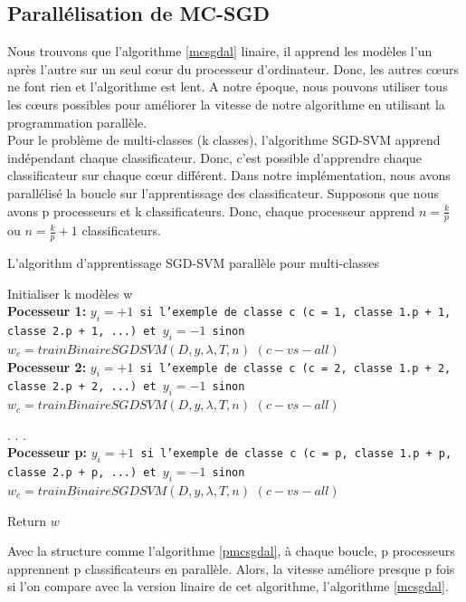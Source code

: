 \pagebreak
\subsection{Parallélisation de MC-SGD}
Nous trouvons que l'algorithme \ref{mcsgdal} linaire, il apprend les modèles l'un après l'autre sur un seul cœur du processeur d'ordinateur. Donc, les autres cœurs ne font rien et l'algorithme est lent. A notre époque, nous pouvons utiliser tous les cœurs possibles pour améliorer la vitesse de notre algorithme en utilisant la programmation parallèle.\\

Pour le problème de multi-classes (k classes), l'algorithme SGD-SVM apprend indépendant chaque classificateur. Donc, c'est possible d'apprendre chaque classificateur sur chaque cœur différent. Dans notre implémentation, nous avons parallélisé la boucle sur l'apprentissage des classificateur. Supposons que nous avons p processeurs et k classificateurs. Donc, chaque processeur apprend $n = \frac{k}{p}$ ou $n = \frac{k}{p} + 1$ classificateurs.

\pagebreak
\begin{algorithm}
\caption{L'algorithm d'apprentissage SGD-SVM parallèle pour multi-classes}\label{pmcsgdal}
\begin{algorithmic}[1]

\State Initialiser k modèles w
\\
\BState \textbf{Pocesseur 1:}
\State \texttt{$y_i = +1$ si l'exemple de classe c (c = 1, classe 1.p + 1, classe 2.p + 1, ...) et $y_i = -1$ sinon}
\State \texttt{$w_c = trainBinaireSGDSVM(D, y, \lambda, T, n)$} $(c-vs-all)$
\\
\BState \textbf{Pocesseur 2:}
\State \texttt{$y_i = +1$ si l'exemple de classe c (c = 2, classe 1.p + 2, classe 2.p + 2, ...) et $y_i = -1$ sinon}
\State \texttt{$w_c = trainBinaireSGDSVM(D, y, \lambda, T, n)$} $(c-vs-all)$

\State .
\State .
\State .
\\
\BState \textbf{Pocesseur p:}
\State \texttt{$y_i = +1$ si l'exemple de classe c (c = p, classe 1.p + p, classe 2.p + p, ...) et $y_i = -1$ sinon}
\State \texttt{$w_c = trainBinaireSGDSVM(D, y, \lambda, T, n)$} $(c-vs-all)$

\BState Return $w$

\EndProcedure
\end{algorithmic}
\end{algorithm}

Avec la structure comme l'algorithme \ref{pmcsgdal}, à chaque boucle, p processeurs apprennent p classificateurs en parallèle. Alors, la vitesse améliore presque p fois si l'on compare avec la version linaire de cet algorithme, l'algorithme \ref{mcsgdal}.


